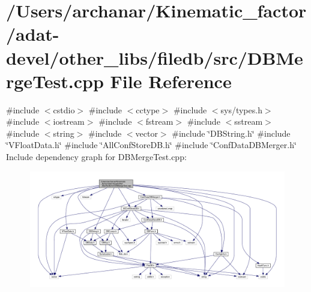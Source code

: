 \hypertarget{adat-devel_2other__libs_2filedb_2src_2DBMergeTest_8cpp}{}\section{/\+Users/archanar/\+Kinematic\+\_\+factor/adat-\/devel/other\+\_\+libs/filedb/src/\+D\+B\+Merge\+Test.cpp File Reference}
\label{adat-devel_2other__libs_2filedb_2src_2DBMergeTest_8cpp}
{\ttfamily \#include $<$cstdio$>$}\newline
{\ttfamily \#include $<$cctype$>$}\newline
{\ttfamily \#include $<$sys/types.\+h$>$}\newline
{\ttfamily \#include $<$iostream$>$}\newline
{\ttfamily \#include $<$fstream$>$}\newline
{\ttfamily \#include $<$sstream$>$}\newline
{\ttfamily \#include $<$string$>$}\newline
{\ttfamily \#include $<$vector$>$}\newline
{\ttfamily \#include \char`\"{}D\+B\+String.\+h\char`\"{}}\newline
{\ttfamily \#include \char`\"{}V\+Float\+Data.\+h\char`\"{}}\newline
{\ttfamily \#include \char`\"{}All\+Conf\+Store\+D\+B.\+h\char`\"{}}\newline
{\ttfamily \#include \char`\"{}Conf\+Data\+D\+B\+Merger.\+h\char`\"{}}\newline
Include dependency graph for D\+B\+Merge\+Test.\+cpp\+:
\nopagebreak
\begin{figure}[H]
\begin{center}
\leavevmode
\includegraphics[width=350pt]{d4/dc5/adat-devel_2other__libs_2filedb_2src_2DBMergeTest_8cpp__incl}
\end{center}
\end{figure}
